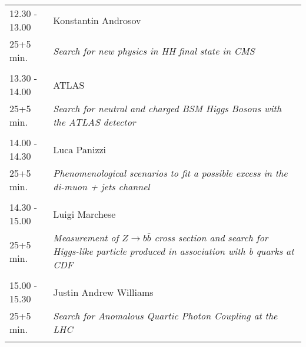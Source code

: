 \begin{longtable}{p{3cm}p{13cm}}
12.30 - 13.00 & Konstantin Androsov\\ 
25+5 min. & {\it Search for new physics in HH final state in CMS}\\ 
 & \\ 
13.30 - 14.00 & ATLAS\\ 
25+5 min. & {\it Search for neutral and charged BSM Higgs Bosons with the ATLAS detector}\\ 
 & \\ 
14.00 - 14.30 & Luca Panizzi\\ 
25+5 min. & {\it Phenomenological scenarios to fit a possible excess in the di-muon + jets channel}\\ 
 & \\ 
14.30 - 15.00 & Luigi Marchese\\ 
25+5 min. & {\it Measurement of $Z \rightarrow b\bar{b}$ cross section and search for Higgs-like particle produced in association with b quarks at CDF}\\ 
 & \\ 
15.00 - 15.30 & Justin Andrew Williams\\ 
25+5 min. & {\it Search for Anomalous Quartic Photon Coupling at the LHC}\\ 
 & \\ 
\end{longtable}

